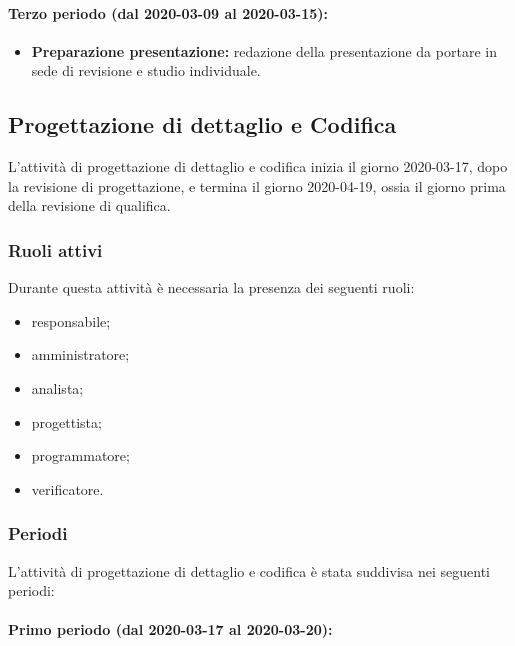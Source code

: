 				\paragraph{Terzo periodo (dal 2020-03-09 al 2020-03-15):}
				
					\begin{itemize}
						\item \textbf{Preparazione presentazione:} redazione della presentazione da portare in sede di revisione e studio individuale.
					\end{itemize}

		\subsection{Progettazione di dettaglio e Codifica}
		
			L'attività di progettazione di dettaglio e codifica inizia il giorno 2020-03-17, dopo la revisione di progettazione, e termina il giorno 2020-04-19, ossia il giorno prima della revisione di qualifica.
			
			\subsubsection{Ruoli attivi}
			
				Durante questa attività è necessaria la presenza dei seguenti ruoli:
				\begin{itemize}
					\item responsabile;
					\item amministratore;
					\item analista;
					\item progettista;
					\item programmatore;
					\item verificatore.
				\end{itemize}
			
			\subsubsection{Periodi}
			
				L'attività di progettazione di dettaglio e codifica è stata suddivisa nei seguenti periodi:
				
				\paragraph{Primo periodo (dal 2020-03-17 al 2020-03-20):}
				
